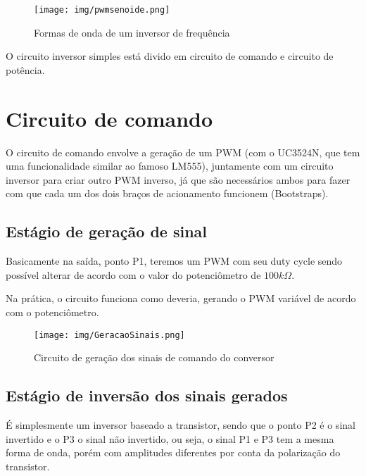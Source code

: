 \documentclass[journal, a4paper]{IEEEtran}
\begin{document}
\begin{figure}[H]\begin{center}
	\texttt{[image: img/pwmsenoide.png]} 
	\caption{Formas de onda de um inversor de frequência}   
	\label{fig:tf_p}
\end{center}\end{figure}

O circuito inversor simples está divido em circuito de comando e circuito de potência.

\section{Circuito de comando}

O circuito de comando envolve a geração de um PWM (com o UC3524N, que tem uma funcionalidade similar ao famoso LM555), juntamente com um circuito inversor para criar outro PWM inverso, já que são necessários ambos para fazer com que cada um dos dois braços de acionamento funcionem (Bootstraps).

\subsection{Estágio de geração de sinal}

Basicamente na saída, ponto P1, teremos um PWM com seu duty cycle sendo possível alterar de acordo com o valor do potenciômetro de $100k\Omega$.

Na prática, o circuito funciona como deveria, gerando o PWM variável de acordo com o potenciômetro.

\begin{figure}[H]\begin{center}
	\texttt{[image: img/GeracaoSinais.png]} 
	\caption{Circuito de geração dos sinais de comando do conversor}   
	\label{fig:tf_p}
\end{center}\end{figure}

\subsection{Estágio de inversão dos sinais gerados}

É simplesmente um inversor baseado a transistor, sendo que o ponto P2 é o sinal invertido e o P3 o sinal não invertido, ou seja, o sinal P1 e P3 tem a mesma forma de onda, porém com amplitudes diferentes por conta da polarização do transistor.
\end{document}
